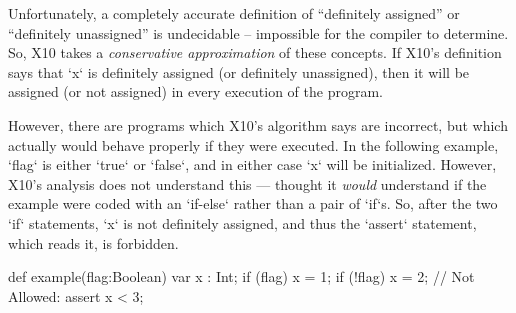 Unfortunately, a completely accurate definition of ``definitely assigned''
or ``definitely unassigned'' is undecidable -- impossible for the compiler to
determine.  So, X10 takes a {\em conservative approximation} of these
concepts.  If X10's definition says that \xcd`x` is definitely assigned (or
definitely unassigned), then it will be assigned (or not assigned) in every
execution of the program.  

However, there are programs which X10's algorithm says are incorrect, but
which actually would behave properly if they were executed.   In the following
example, \xcd`flag` is either \xcd`true` or \xcd`false`, and in either case
\xcd`x` will be initialized.  However, X10's analysis does not understand this
--- thought it {\em would} understand if the example were coded with an
\xcd`if-else` rather than a pair of \xcd`if`s.  So, after the two \xcd`if`
statements, \xcd`x` is not definitely assigned, and thus the \xcd`assert`
statement, which reads it, is forbidden.  
\begin{xten}
def example(flag:Boolean) {
  var x : Int;
  if (flag) x = 1;
  if (!flag) x = 2;
  // Not Allowed: assert x < 3;
}
\end{xten}

